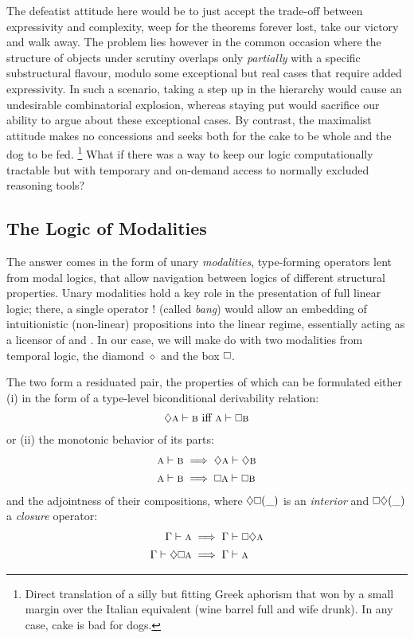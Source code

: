 The defeatist attitude here would be to just accept the trade-off between expressivity and complexity, weep for the theorems forever lost, take our victory and walk away.
The problem lies however in the common occasion where the structure of objects under scrutiny overlaps only \textit{partially} with a specific substructural flavour, modulo some exceptional but real cases that require added expressivity.
In such a scenario, taking a step up in the hierarchy would cause an undesirable combinatorial explosion, whereas staying put would sacrifice our ability to argue about these exceptional cases. 
By contrast, the maximalist attitude makes no concessions and seeks both for the cake to be whole and the dog to be fed.%
\footnote{Direct translation of a silly but fitting Greek aphorism that won by a small margin over the Italian equivalent (wine barrel full and wife drunk). In any case, cake is bad for dogs.}
What if there was a way to keep our logic computationally tractable but with temporary and on-demand access to normally excluded reasoning tools?

\subsection{The Logic of Modalities}\label{subsec:modal_logic}
The answer comes in the form of unary \textit{modalities}, type-forming operators lent from modal logics, that allow navigation between logics of different structural properties.
Unary modalities hold a key role in the presentation of full linear logic; there, a single operator $!$ (called \textit{bang}) would allow an embedding of intuitionistic (non-linear) propositions into the linear regime, essentially acting as a licensor of \Contraction{} and \Weakening{}.
In our case, we will make do with two modalities from temporal logic, the diamond $\diamond$ and the box $\bx$.

The two form a residuated pair, the properties of which can be formulated either (i) in the form of a type-level biconditional derivability relation:
\begin{equation}
		\diamond \prop{a} \vdash \prop{b}\text{ iff }\prop{a} \vdash \bx\prop{b}
\end{equation}
or (ii) the monotonic behavior of its parts:
\begin{align}
		\prop{a} \vdash \prop{b} & \implies \diamond \prop{a}\vdash \diamond\prop{b}\\
		\prop{a} \vdash \prop{b} & \implies \bx{\prop{a}}\vdash \bx\prop{b}
\end{align}
and the adjointness of their compositions, where $\diamond\bx(\_)$ is an \textit{interior} and $\bx\diamond(\_)$ a \textit{closure} operator:
\begin{align}
		\Gamma \vdash \prop{a} 				& \implies \Gamma \vdash \bx\diamond\prop{a} \label{equation:closure}\\
		\Gamma \vdash \diamond\bx\prop{a} & \implies \Gamma \vdash \prop{a} \label{equation:interior}
\end{align}

